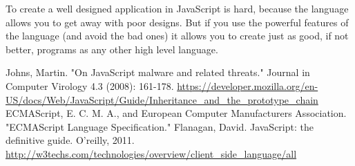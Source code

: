 \documentclass{report}
\begin{document}
To create a well designed application in JavaScript is hard, because the language allows you to get away with poor designs. But if you use the powerful features of the language (and avoid the bad ones) it allows you to create just as good, if not better, programs as any other high level language.
\begin{thebibliography}{99}
Johns, Martin. "On JavaScript malware and related threats." Journal in Computer Virology 4.3 (2008): 161-178.
\url{https://developer.mozilla.org/en-US/docs/Web/JavaScript/Guide/Inheritance\_and\_the\_prototype\_chain}
ECMAScript, E. C. M. A., and European Computer Manufacturers Association. "ECMAScript Language Specification."
Flanagan, David. JavaScript: the definitive guide. O'reilly, 2011.
\url{http://w3techs.com/technologies/overview/client_side_language/all}
\end{thebibliography}
\end{document}
